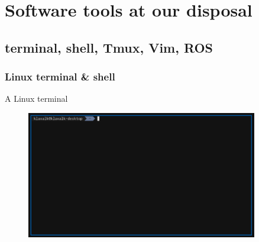 \documentclass[aspectratio=1610]{beamer}
\begin{document}

  \section{Software tools at our disposal}
  \subsection{terminal, shell, Tmux, Vim, ROS}


  \begin{frame}
    \frametitle{Linux terminal \& shell}

    \begin{block}{A Linux terminal}
      \begin{figure}
        \includegraphics[width=0.9\textwidth]{./fig/terminal.png}
      \end{figure}
    \end{block}

  \end{frame}


\end{document}
